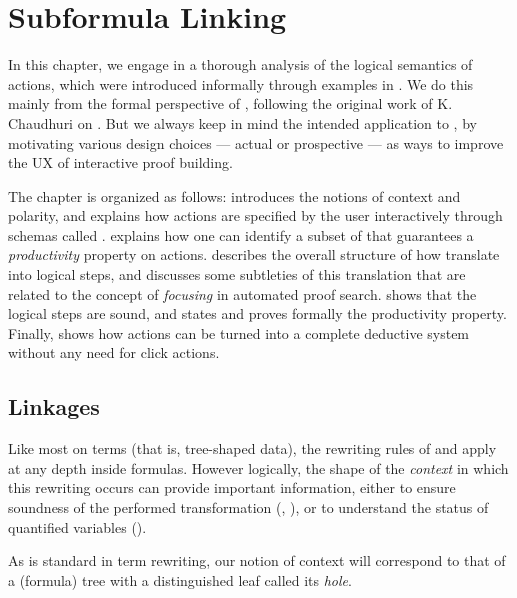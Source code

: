 \setchapterpreamble[u]{\margintoc}
\chapter{Subformula Linking}

In this chapter, we engage in a thorough analysis of the logical semantics of
 actions, which were introduced informally through examples in .
We do this mainly from the formal perspective of  ,
following the original work of K. Chaudhuri on \emph{}
\cite{Chaudhuri2013}. But we always keep in mind the intended application to
, by motivating various design choices --- actual or prospective
--- as ways to improve the UX of interactive proof building.

The chapter is organized as follows:  introduces the notions of
context and polarity, and explains how  actions are specified by the user
interactively through schemas called \emph{}.  explains
how one can identify a subset of  that guarantees a \emph{productivity}
property on  actions.  describes the overall structure of how
 translate into logical steps, and  discusses some
subtleties of this translation that are related to the concept of
\emph{focusing} in automated proof search.  shows that the
logical steps are sound, and  states and proves formally
the productivity property. Finally,  shows how 
actions can be turned into a complete deductive system without any need for
click actions.

\section{Linkages}

Like most  on terms (that is, tree-shaped data), the rewriting
rules of  and  apply at any depth inside formulas.
However logically, the shape of the \emph{context} in which this rewriting
occurs can provide important information, either to ensure soundness of the
performed transformation (, ), or to
understand the status of quantified variables ().

As is standard in term rewriting, our notion of context will correspond to that
of a (formula) tree with a distinguished leaf called its \emph{hole}.

